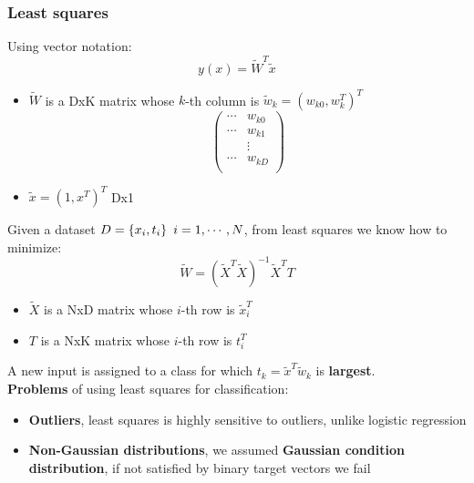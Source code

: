 \subsubsection{Least squares}
    Using vector notation:
    $$y(x)=\tilde{W}^T\tilde{x}$$
    \begin{itemize}
        \item $\tilde{W}$ is a DxK matrix whose $k$-th column is $\tilde{w}_k=(w_{k0},w_k^T)^T$
        $$
        \begin{pmatrix}
            \cdots & w_{k0}\\
            \cdots & w_{k1}\\
            & \vdots\\
            \cdots & w_{kD}\\
        \end{pmatrix}
        $$
        \item $\tilde{x}=(1,x^T)^T$ Dx1
    \end{itemize}
    Given a dataset $D=\{x_i,t_i\}\hspace{0.5em}i=1,\cdots,N$, from least squares we know how to minimize:
    $$\tilde{W}=(\tilde{X}^T\tilde{X})^{-1}\tilde{X}^TT$$
    \begin{itemize}
        \item $\tilde{X}$ is a NxD matrix whose $i$-th row is $\tilde{x}_i^T$
        \item $T$ is a NxK matrix whose $i$-th row is $t_i^T$
    \end{itemize}
    A new input is assigned to a class for which $t_k=\tilde{x}^T\tilde{w}_k$ is \textbf{largest}.\\
    \textbf{Problems} of using least squares for classification:
    \begin{itemize}
        \item \textbf{Outliers}, least squares is highly sensitive to outliers, unlike logistic regression
        \item \textbf{Non-Gaussian distributions}, we assumed \textbf{Gaussian condition distribution}, if not satisfied by binary target vectors we fail
    \end{itemize}
